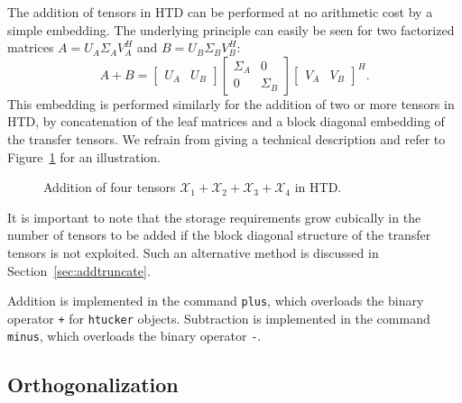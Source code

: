 \documentclass[11pt, a4paper]{article}
\newcommand{\calT}{\mathcal{T}}
\newcommand{\calX}{\mathcal{X}}
\begin{document}
The addition of tensors in HTD can be performed at no arithmetic cost by a simple embedding. The underlying principle
can easily be seen for two factorized matrices $A = U_A \Sigma_A V_A^H$ and $B = U_B \Sigma_B V_B^H$:  \[
 A+B = \left[\begin{array}{cc}
U_A & U_B
\end{array}
\right]\left[\begin{array}{cc}
\Sigma_A & 0 \\
0 & \Sigma_B
\end{array}
\right]\left[\begin{array}{cc}
V_A & V_B
\end{array}
\right]^H.
\]
This embedding is performed similarly for the addition of two or more tensors in HTD, by
concatenation of the leaf matrices and a block diagonal embedding of the transfer tensors.
We refrain from giving a technical description and refer to Figure~\ref{fig:addition} for an illustration.
\begin{figure}
  \begin{center}
    \resizebox{8cm}{!}{}
  \end{center}
\caption{Addition of four tensors $\calX_1 + \calX_2 + \calX_3 + \calX_4$ in HTD.} \label{fig:addition}
 \end{figure}
It is important to note that the storage requirements grow cubically in the number of tensors to be added
if the block diagonal structure of the transfer tensors is not exploited. Such an alternative method is discussed in Section~\ref{sec:addtruncate}.

\begin{preprint}
Addition is implemented in the command {\tt plus}, which overloads the binary operator {\tt +} for {\tt htucker} objects.
Subtraction is implemented in the command {\tt minus}, which overloads the binary operator {\tt -}.
\end{preprint}

\subsection{Orthogonalization} \label{sec:orthogonalization}

\end{document}

